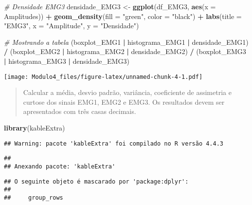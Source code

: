 \documentclass[
]{article}
\newenvironment{Shaded}{\begin{snugshade}}{\end{snugshade}}
\newcommand{\AttributeTok}[1]{\textcolor[rgb]{0.13,0.29,0.53}{#1}}
\newcommand{\CommentTok}[1]{\textcolor[rgb]{0.56,0.35,0.01}{\textit{#1}}}
\newcommand{\FunctionTok}[1]{\textcolor[rgb]{0.13,0.29,0.53}{\textbf{#1}}}
\newcommand{\NormalTok}[1]{#1}
\newcommand{\OtherTok}[1]{\textcolor[rgb]{0.56,0.35,0.01}{#1}}
\newcommand{\SpecialCharTok}[1]{\textcolor[rgb]{0.81,0.36,0.00}{\textbf{#1}}}
\newcommand{\StringTok}[1]{\textcolor[rgb]{0.31,0.60,0.02}{#1}}
\begin{document}
\begin{Shaded}
\begin{Highlighting}[]
\CommentTok{\# Densidade EMG3}
\NormalTok{densidade\_EMG3 }\OtherTok{\textless{}{-}} \FunctionTok{ggplot}\NormalTok{(df\_EMG3, }\FunctionTok{aes}\NormalTok{(}\AttributeTok{x =}\NormalTok{ Amplitudes)) }\SpecialCharTok{+}
  \FunctionTok{geom\_density}\NormalTok{(}\AttributeTok{fill =} \StringTok{"green"}\NormalTok{, }\AttributeTok{color =} \StringTok{"black"}\NormalTok{) }\SpecialCharTok{+}
  \FunctionTok{labs}\NormalTok{(}\AttributeTok{title =} \StringTok{"EMG3"}\NormalTok{, }\AttributeTok{x =} \StringTok{"Amplitude"}\NormalTok{, }\AttributeTok{y =} \StringTok{"Densidade"}\NormalTok{)}

\CommentTok{\# Mostrando a tabela }
\NormalTok{(boxplot\_EMG1 }\SpecialCharTok{|}\NormalTok{ histograma\_EMG1 }\SpecialCharTok{|}\NormalTok{ densidade\_EMG1) }\SpecialCharTok{/}
\NormalTok{(boxplot\_EMG2 }\SpecialCharTok{|}\NormalTok{ histograma\_EMG2 }\SpecialCharTok{|}\NormalTok{ densidade\_EMG2) }\SpecialCharTok{/}
\NormalTok{(boxplot\_EMG3 }\SpecialCharTok{|}\NormalTok{ histograma\_EMG3 }\SpecialCharTok{|}\NormalTok{ densidade\_EMG3)}
\end{Highlighting}
\end{Shaded}

\texttt{[image: Modulo4\_files/figure-latex/unnamed-chunk-4-1.pdf]}

\begin{quote}
Calcular a média, desvio padrão, variância, coeficiente de assimetria e
curtose dos sinais EMG1, EMG2 e EMG3. Os resultados devem ser
apresentados com três casas decimais.
\end{quote}

\begin{Shaded}
\begin{Highlighting}[]
\FunctionTok{library}\NormalTok{(kableExtra)}
\end{Highlighting}
\end{Shaded}

\begin{verbatim}
## Warning: pacote 'kableExtra' foi compilado no R versão 4.4.3
\end{verbatim}

\begin{verbatim}
## 
## Anexando pacote: 'kableExtra'
\end{verbatim}

\begin{verbatim}
## O seguinte objeto é mascarado por 'package:dplyr':
## 
##     group_rows
\end{verbatim}
\end{document}
